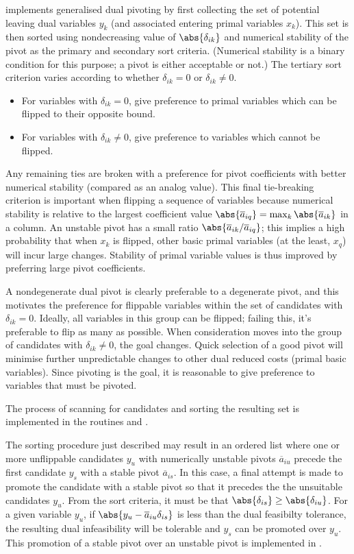 \dylp implements generalised dual pivoting by first collecting the set
of potential leaving dual variables $y_k$ (and associated entering primal
variables $x_k$).
This set is then sorted using nondecreasing value of $\abs{\delta_{ik}}$ 
and numerical stability of the pivot as the primary and secondary sort criteria.
(Numerical stability is a binary condition for this purpose; a pivot is either
acceptable or not.)
The tertiary sort criterion varies according to whether $\delta_{ik} = 0$
or $\delta_{ik} \neq 0$.
\begin{itemize}
  \item
  For variables with $\delta_{ik} = 0$, give preference to primal variables
  which can be flipped to their opposite bound.

  \item
  For variables with $\delta_{ik} \neq 0$, give preference to variables which
  cannot be flipped.
\end{itemize}
Any remaining ties are broken with a preference for pivot coefficients with
better numerical stability (compared as an analog value).
This final tie-breaking criterion is important when flipping a sequence
of variables because numerical
stability is relative to the largest coefficient value
$\abs{\overline{a}_{iq}} = \max_k \abs{\overline{a}_{ik}}$
in a column.
An unstable pivot has a small ratio
$\abs{\overline{a}_{ik}/\overline{a}_{iq}}$; this implies a high probability
that when $x_k$ is flipped, other basic primal variables (at the least, $x_q$)
will incur large changes.
Stability of primal variable values is thus improved by preferring large
pivot coefficients.

A nondegenerate dual pivot is clearly preferable to a degenerate pivot, and
this motivates the preference for flippable variables within the set of
candidates with $\delta_{ik} = 0$.
Ideally, all variables in this group can be flipped; failing this, it's
preferable to flip as many as possible.
When consideration moves into the group of candidates with
$\delta_{ik} \neq 0$, the goal changes.
Quick selection of a good pivot will minimise further unpredictable changes
to other dual reduced costs (primal basic variables).
Since pivoting is the goal, it is reasonable to give preference to variables
that must be pivoted.

The process of scanning for candidates and sorting the resulting set is
implemented in the routines  and
.

The sorting procedure just described may result in an ordered list where
one or more unflippable candidates $y_u$ with numerically unstable pivots
$\overline{a}_{iu}$ precede the first candidate $y_s$ with a stable
pivot $\overline{a}_{is}$.
In this case, a final attempt is made to promote the candidate with a
stable pivot so that it precedes the the unsuitable candidates $y_u$.
From the sort criteria, it must be that
$\abs{\delta_{is}} \geq \abs{\delta_{iu}}$.
For a given variable $y_u$, if $\abs{y_u - \overline{a}_{iu} \delta_{is}}$
is less than the dual feasibilty tolerance, the resulting dual infeasibility
will be tolerable and $y_s$ can be promoted over $y_u$.
This promotion of a stable pivot over an unstable pivot is implemented in
.

